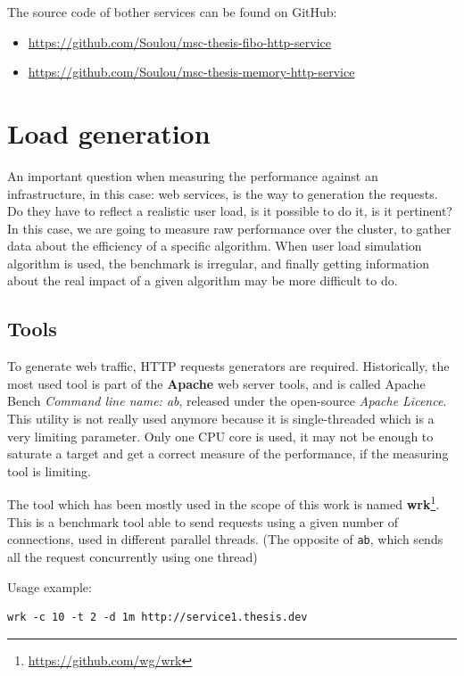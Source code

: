 The source code of bother services can be found on GitHub:
\begin{itemize}
\item{\url{https://github.com/Soulou/msc-thesis-fibo-http-service}}
\item{\url{https://github.com/Soulou/msc-thesis-memory-http-service}}
\end{itemize}

\section{Load generation}

An important question when measuring the performance against an infrastructure,
in this case: web services, is the way to generation the requests. Do they
have to reflect a realistic user load, is it possible to do it, is it pertinent?
In this case, we are going to measure raw performance over the cluster, to gather
data about the efficiency of a specific algorithm. When user load simulation algorithm
is used, the benchmark is irregular, and finally getting information about
the real impact of a given algorithm may be more difficult to do.

\subsection{Tools}

To generate web traffic, HTTP requests generators are required. Historically,
the most used tool is part of the \textbf{Apache} web server tools, and is
called Apache Bench \textit{Command line name: ab}, released under the open-source
\textit{Apache Licence}. This utility is not really
used anymore because it is single-threaded which is a very limiting parameter.
Only one CPU core is used, it may not be enough to saturate a target and get a
correct measure of the performance, if the measuring tool is limiting.

The tool which has been mostly used in the scope of this work is named
\textbf{wrk}\footnote{\url{https://github.com/wg/wrk}}. This is a benchmark
tool able to send requests using a given number of connections, used in
different parallel threads. (The opposite of \texttt{ab}, which sends all
the request concurrently using one thread)

Usage example:

\vspace{1em}
\begin{lstlisting}
wrk -c 10 -t 2 -d 1m http://service1.thesis.dev
\end{lstlisting}

